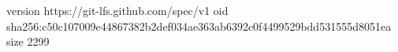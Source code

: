 version https://git-lfs.github.com/spec/v1
oid sha256:c50c107009e44867382b2def034ae363ab6392c0f4499529bdd531555d8051ea
size 2299
